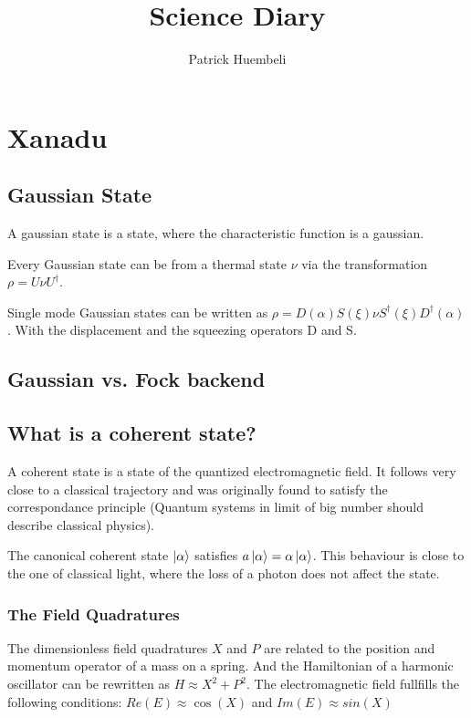 \documentclass[a4paper]{article}
\title{Science Diary}
\author{Patrick Huembeli}
\begin{document}
\section{Xanadu}

\subsection{Gaussian State}

A gaussian state is a state, where the characteristic function is a gaussian.

Every Gaussian state can be from a thermal state $\nu$ via the transformation $\rho =  U \nu U^{\dag}$.

Single mode Gaussian states can be written as $ \rho = D(\alpha) S(\xi) \nu S^{\dag}(\xi) D^{\dag}( \alpha)$. With the displacement and the squeezing operators D and S.

\subsection{Gaussian vs. Fock backend}



\subsection{What is a coherent state?}

A coherent state is a state of the quantized electromagnetic field. It follows very close to a classical trajectory and was originally found to satisfy the correspondance principle (Quantum systems in limit of big number should describe classical physics).

The canonical coherent state $\ket{ \alpha}$ satisfies $a \ket{ \alpha} = \alpha \ket{ \alpha}$. This behaviour is close to the one of classical light, where the loss of a photon does not affect the state.

\subsubsection{The Field Quadratures}

The dimensionless field quadratures $X$ and $P$ are related to the position and momentum operator of a mass on a spring. And the Hamiltonian of a harmonic oscillator can be rewritten as $H \approx X^2 + P^2$. The electromagnetic field fullfills the following conditions: $Re (E) \approx \cos(X)$ and $Im(E) \approx sin(X)$
\end{document}
